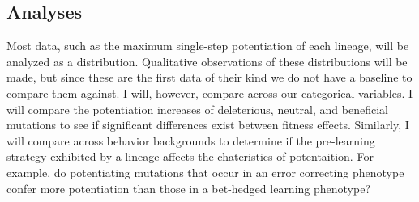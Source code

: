 


\subsection{Analyses}

Most data, such as the maximum single-step potentiation of each lineage, will be analyzed as a distribution. 
Qualitative observations of these distributions will be made, but since these are the first data of their kind we do not have a baseline to compare them against. 
I will, however, compare across our categorical variables. 
I will compare the potentiation increases of deleterious, neutral, and beneficial mutations to see if significant differences exist between fitness effects. 
Similarly, I will compare across behavior backgrounds to determine if the pre-learning strategy exhibited by a lineage affects the chateristics of potentaition. 
For example, do potentiating mutations that occur in an error correcting phenotype confer more potentiation than those in a bet-hedged learning phenotype? 


